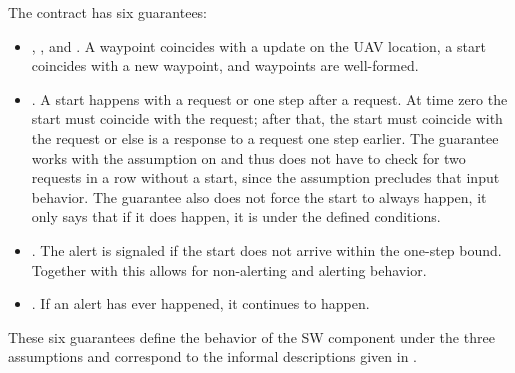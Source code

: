 \noindent The contract has six guarantees:
\begin{itemize}
\item {}, , and .
A waypoint coincides with a update on the UAV location, a start coincides with a new waypoint, and waypoints are well-formed.
\item {}. A start happens with a request or one step after a request. At time zero the start must coincide
with the request; after that, the start must coincide with the request
or else is a response to a request one step earlier.  The guarantee
works with the assumption on  and thus does
not have to check for two requests in a row without a start, since the
assumption precludes that input behavior. The guarantee also does not
force the start to always happen, it only says that if it does happen,
it is under the defined conditions.

\item {}. The alert is signaled if the start does not arrive within the one-step bound. Together with  this allows
for non-alerting and alerting behavior.
\item {}. If an alert has ever happened,
it continues to happen.
\end{itemize}
These six guarantees define the behavior of the SW component under the
three assumptions and correspond to the informal descriptions given
in .
